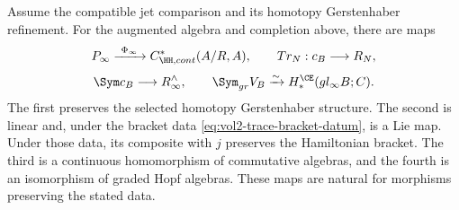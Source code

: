 \begin{theorem}
Assume the compatible jet comparison and its homotopy Gerstenhaber refinement.
For the augmented algebra and completion above, there are maps
\[
 \mathcal P_\infty
 \xrightarrow{\ \Phi_\infty\ }
 C^*_{\HH,\mathrm{cont}}(\mathcal A/R,\mathcal A),
 \qquad
 \operatorname{Tr}_N:\mathfrak c_B\longrightarrow\mathcal R_N,
\]
\[
 \widehat\Sym\overline{\mathfrak c}_B
 \longrightarrow\mathcal R_\infty^{\wedge},
 \qquad
 \Sym_{\mathrm{gr}}V_B
 \xrightarrow{\sim}
 H_*^{\CE}(\mathfrak{gl}_\infty B;\C).
\]
The first preserves the selected homotopy Gerstenhaber structure.
The second is linear and, under the bracket data
\eqref{eq:vol2-trace-bracket-datum}, is a Lie map.
Under those data, its composite with $j$ preserves the Hamiltonian bracket.
The third is a continuous homomorphism of commutative algebras,
and the fourth is an isomorphism of graded Hopf algebras.
These maps are natural for morphisms preserving the stated data.
\end{theorem}
